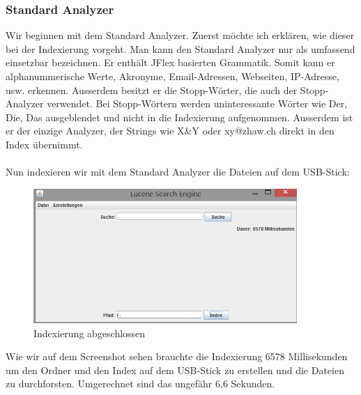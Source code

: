 \documentclass[12pt,a4paper,ngerman]{report}
\begin{document}
\subsubsection{Standard Analyzer}
Wir beginnen mit dem Standard Analyzer. Zuerst möchte ich erklären, wie dieser bei der Indexierung vorgeht. Man kann den Standard Analyzer nur als umfassend einsetzbar bezeichnen. Er enthält JFlex basierten Grammatik. Somit kann er alphanummerische Werte, Akronyme, Email-Adressen, Webseiten, IP-Adresse, usw. erkennen. Ausserdem besitzt er die Stopp-Wörter, die auch der Stopp-Analyzer verwendet. Bei Stopp-Wörtern werden uninteressante Wörter wie Der, Die, Das ausgeblendet und nicht in die Indexierung aufgenommen. Ausserdem ist er der einzige Analyzer, der Strings wie X\&Y oder xy@zhaw.ch direkt in den Index übernimmt.\\
\\
Nun indexieren wir mit dem Standard Analyzer die Dateien auf dem USB-Stick:
\begin{figure}[h!]
\centering
\includegraphics[width=10cm]{img/standard-analyzer-index.png}
\caption{Indexierung abgeschlossen\protect\footnotemark}
\end{figure}
Wie wir auf dem Screenshot sehen brauchte die Indexierung 6578 Millisekunden um den Ordner und den Index auf dem USB-Stick zu erstellen und die Dateien zu durchforsten. Umgerechnet sind das ungefähr 6,6 Sekunden.
\end{document}
